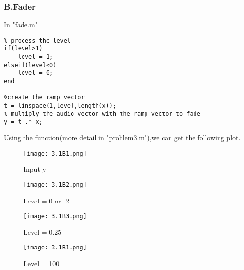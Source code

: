 \documentclass{article}
\begin{document}
\subsubsection*{B.Fader}
In "fade.m"
\begin{lstlisting}
% process the level
if(level>1)
    level = 1;
elseif(level<0)
    level = 0;
end

%create the ramp vector
t = linspace(1,level,length(x));
% multiply the audio vector with the ramp vector to fade
y = t .* x;
\end{lstlisting}
Using the function(more detail in "problem3.m"),we can get the following plot.
\begin{figure}[h]
    \begin{minipage}{0.45\textwidth}
        \centering
        \texttt{[image: 3.1B1.png]}
        \caption{Input y}
    \end{minipage}
    \begin{minipage}{0.45\textwidth}
        \centering
        \texttt{[image: 3.1B2.png]}
        \caption{Level = 0 or -2}
    \end{minipage}
    \quad

    \begin{minipage}{0.45\textwidth}
        \centering
        \texttt{[image: 3.1B3.png]}
        \caption{Level = 0.25}
    \end{minipage}
    \begin{minipage}{0.45\textwidth}
        \centering
        \texttt{[image: 3.1B1.png]}
        \caption{Level = 100}
    \end{minipage}
\end{figure}
\end{document}
